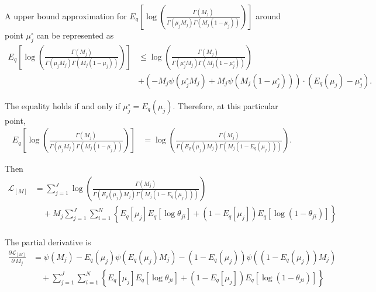 \documentclass[11pt,reqno]{amsart}
\begin{document}
A upper bound approximation for $ E_q  \left[ \log \left( \frac{ \Gamma(M_j) } { \Gamma(\mu_j M_j) \Gamma(M_j (1-\mu_j)) }\right) \right] $ around point $ \mu_j^{\circ} $ can be represented as
\begin{equation}
\begin{split}
E_q  \left[ \log \left( \frac{ \Gamma(M_j) } { \Gamma(\mu_j M_j) \Gamma(M_j (1-\mu_j)) }\right) \right] &\leq \log\left( \frac{\Gamma(M_j)}{\Gamma(\mu_j^{\circ} M_j) \Gamma(M_j (1-\mu_j^{\circ} ))}\right) \\
\quad &+ \left( -M_j \psi (\mu_j^{\circ} M_j) + M_j \psi(M_j (1-\mu_j^{\circ} ))\right) \cdot (E_q(\mu_j)-\mu_j^{\circ}).\nonumber
\end{split}
\end{equation}

The equality holds if and only if $ \mu_j^{\circ} =E_q(\mu_j) $. Therefore, at this particular point,
\begin{equation}
\begin{split}
E_q  \left[ \log \left( \frac{ \Gamma(M_j) } { \Gamma(\mu_j M_j) \Gamma(M_j (1-\mu_j)) }\right) \right] &= \log\left( \frac{\Gamma(M_j)}{\Gamma(E_q(\mu_j) M_j) \Gamma(M_j (1-E_q(\mu_j) ))}\right).\nonumber
\end{split}
\end{equation}

Then
\begin{equation}
\begin{split}
\label{M}
\mathcal{L}_{{[M]}} 
&= \sum_{j=1}^{J} \log\left( \frac{\Gamma(M_j)}{\Gamma(E_q(\mu_j) M_j) \Gamma(M_j (1-E_q(\mu_j) ))}\right) \\ 
&\quad + M_j \sum_{j=1}^{J} \sum_{i=1}^{N} \left\lbrace E_q \left[ \mu_j \right] E_q \left[ \log \theta_{ji} \right] + \left( 1 - E_q\left[ \mu_j \right]  \right) E_q\left[ \log \left( 1 - \theta_{ji}\right) \right] \right\rbrace \\
\end{split}
\end{equation}

The partial derivative is
\begin{equation}
\begin{split}
\frac{\partial \mathcal{L}_{{[M]}} }{\partial \ M_j} 
&= \psi(M_j) - E_q(\mu_j) \psi(E_q(\mu_j) M_j)
- (1-E_q(\mu_j)) \psi((1-E_q(\mu_j)) M_j) \\
&\quad + \sum_{j=1}^{J} \sum_{i=1}^{N} \left\lbrace E_q \left[ \mu_j \right] E_q \left[ \log \theta_{ji} \right] 
+ \left( 1 - E_q\left[ \mu_j \right]  \right) E_q\left[ \log \left( 1 - \theta_{ji}\right) \right] \right\rbrace \\
\end{split}
\end{equation}
\end{document}
